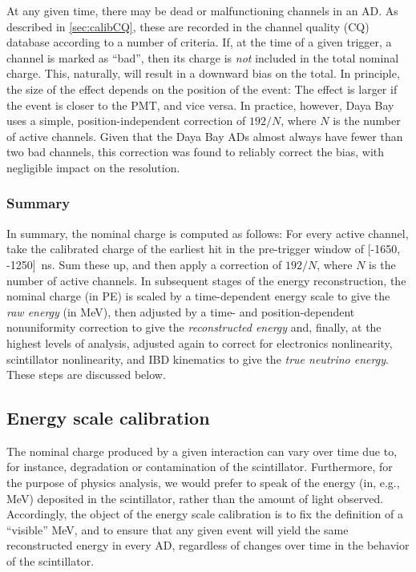 \documentclass[../thesis.tex]{subfiles}
\begin{document}
At any given time, there may be dead or malfunctioning channels in an AD. As described in \autoref{sec:calibCQ}, these are recorded in the channel quality (CQ) database according to a number of criteria. If, at the time of a given trigger, a channel is marked as ``bad'', then its charge is \emph{not} included in the total nominal charge. This, naturally, will result in a downward bias on the total. In principle, the size of the effect depends on the position of the event: The effect is larger if the event is closer to the PMT, and vice versa. In practice, however, Daya Bay uses a simple, position-independent correction of $192/N$, where $N$ is the number of active channels. Given that the Daya Bay ADs almost always have fewer than two bad channels, this correction was found to reliably correct the bias, with negligible impact on the resolution.

\subsubsection{Summary}
\label{sec:reconChargeSummary}

In summary, the nominal charge is computed as follows: For every active channel, take the calibrated charge of the earliest hit in the pre-trigger window of [-1650, -1250]~ns. Sum these up, and then apply a correction of $192/N$, where $N$ is the number of active channels. In subsequent stages of the energy reconstruction, the nominal charge (in PE) is scaled by a time-dependent energy scale to give the \emph{raw energy} (in MeV), then adjusted by a time- and position-dependent nonuniformity correction to give the \emph{reconstructed energy} and, finally, at the highest levels of analysis, adjusted again to correct for electronics nonlinearity, scintillator nonlinearity, and IBD kinematics to give the \emph{true neutrino energy}. These steps are discussed below.

\subsection{Energy scale calibration}
\label{sec:reconEnergyScale}

The nominal charge produced by a given interaction can vary over time due to, for instance, degradation or contamination of the scintillator. Furthermore, for the purpose of physics analysis, we would prefer to speak of the energy (in, e.g., MeV) deposited in the scintillator, rather than the amount of light observed. Accordingly, the object of the energy scale calibration is to fix the definition of a ``visible'' MeV, and to ensure that any given event will yield the same reconstructed energy in every AD, regardless of changes over time in the behavior of the scintillator.
\end{document}
